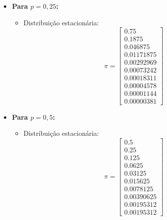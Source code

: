 \begin{enumerate}
\begin{resposta}
        \begin{itemize}
            \item \textbf{Para $p = 0{,}25$:}
            \begin{itemize}
                \item Distribuição estacionária:
                $$
                \pi = 
                \begin{bmatrix}
                0.75 \\
                0.1875 \\
                0.046875 \\
                0.01171875 \\
                0.00292969 \\
                0.00073242 \\
                0.00018311 \\
                0.00004578 \\
                0.00001144 \\
                0.00000381
                \end{bmatrix}
                $$
            \end{itemize}

            \item \textbf{Para $p = 0{,}5$:}
            \begin{itemize}
                \item Distribuição estacionária:
                $$
                \pi = 
                \begin{bmatrix}
                0.5 \\
                0.25 \\
                0.125 \\
                0.0625 \\
                0.03125 \\
                0.015625 \\
                0.0078125 \\
                0.00390625 \\
                0.00195312 \\
                0.00195312
                \end{bmatrix}
                $$
            \end{itemize}


\end{itemize}
\end{resposta}
\end{enumerate}

